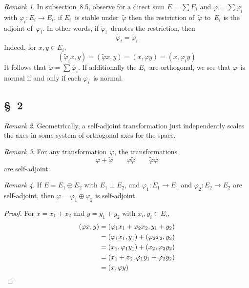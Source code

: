 \documentclass[letterpaper,12pt]{article}
\newcommand{\orth}{\perp}
\newcommand{\dsum}{\oplus}
\newcommand{\iprod}[2]{(#1,#2)}
\newcommand{\adj}[1]{\widetilde{#1}}
\theoremstyle{definition}
\theoremstyle{remark}
\newtheorem*{rmk}{Remark}
\begin{document}
\begin{rmk}
In subsection~8.5, observe for a direct sum \(E=\sum E_i\) and \(\varphi=\sum\varphi_i\) with \(\varphi_i:E_i\to E_i\), if \(E_i\)~is stable under~\(\adj{\varphi}\) then the restriction of~\(\adj{\varphi}\) to~\(E_i\) is the adjoint of~\(\varphi_i\). In other words, if \(\adj{\varphi}_i\)~denotes the restriction, then
\[\adj{\varphi}_i=\adj{\varphi_i}\]
Indeed, for \(x,y\in E_i\),
\[\iprod{\adj{\varphi}_i x}{y}=\iprod{\adj{\varphi}x}{y}=\iprod{x}{\varphi y}=\iprod{x}{\varphi_i y}\]
It follows that \(\adj{\varphi}=\sum\adj{\varphi_i}\). If additionally the \(E_i\)~are orthogonal, we see that \(\varphi\)~is normal if and only if each \(\varphi_i\)~is normal.
\end{rmk}

\subsection*{\S~2}
\begin{rmk}
Geometrically, a self-adjoint transformation just independently scales the axes in some system of orthogonal axes for the space.
\end{rmk}

\begin{rmk}
For any transformation~\(\varphi\), the transformations
\[\varphi+\adj{\varphi}\qquad\varphi\adj{\varphi}\qquad\adj{\varphi}\varphi\]
are self-adjoint.
\end{rmk}

\begin{rmk}
If \(E=E_1\dsum E_2\) with \(E_1\orth E_2\), and \(\varphi_1:E_1\to E_1\) and \(\varphi_2:E_2\to E_2\) are self-adjoint, then \(\varphi=\varphi_1\dsum\varphi_2\) is self-adjoint.
\end{rmk}
\begin{proof}
For \(x=x_1+x_2\) and \(y=y_1+y_2\) with \(x_i,y_i\in E_i\),
\begin{align*}
\iprod{\varphi x}{y}&=\iprod{\varphi_1 x_1+\varphi_2 x_2}{y_1+y_2}\\
	&=\iprod{\varphi_1 x_1}{y_1}+\iprod{\varphi_2 x_2}{y_2}\\
	&=\iprod{x_1}{\varphi_1 y_1}+\iprod{x_2}{\varphi_2 y_2}\\
	&=\iprod{x_1+x_2}{\varphi_1 y_1+\varphi_2 y_2}\\
	&=\iprod{x}{\varphi y}\qedhere
\end{align*}
\end{proof}
\end{document}
